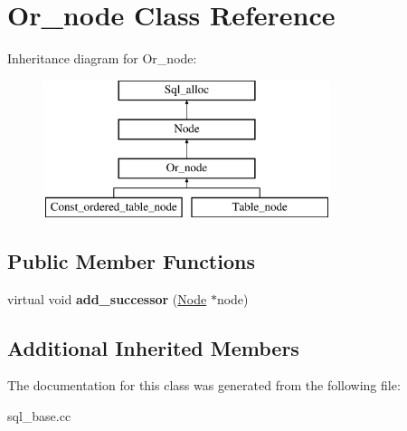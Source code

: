 \hypertarget{classOr__node}{}\section{Or\+\_\+node Class Reference}
\label{classOr__node}
Inheritance diagram for Or\+\_\+node\+:\begin{figure}[H]
\begin{center}
\leavevmode
\includegraphics[height=4.000000cm]{classOr__node}
\end{center}
\end{figure}
\subsection*{Public Member Functions}
\begin{DoxyCompactItemize}
\item 
\mbox{\label{classOr__node_a77a28ad1cface862bf113680e309b351}} 
virtual void {\bfseries add\+\_\+successor} (\mbox{\hyperlink{classNode}{Node}} $\ast$node)
\end{DoxyCompactItemize}
\subsection*{Additional Inherited Members}


The documentation for this class was generated from the following file\+:\begin{DoxyCompactItemize}
\item 
sql\+\_\+base.\+cc\end{DoxyCompactItemize}

